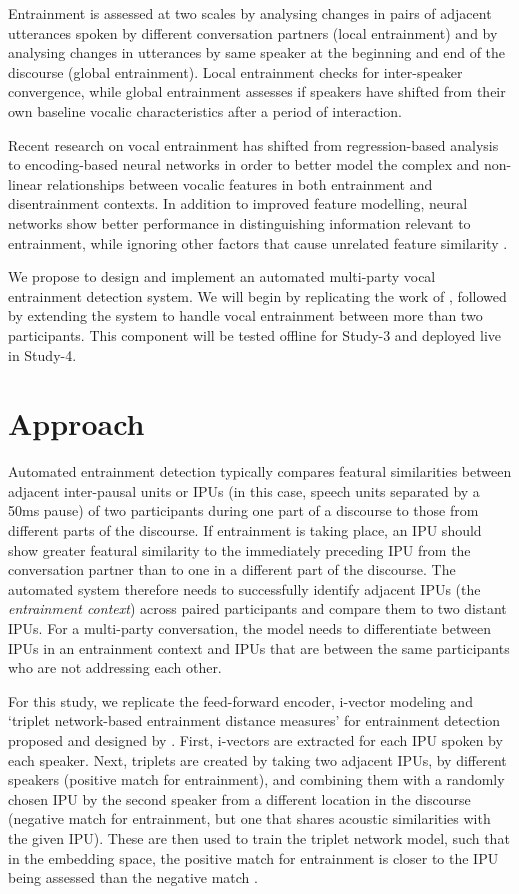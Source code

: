 Entrainment is assessed at two scales by analysing changes in pairs of adjacent
utterances spoken by different conversation partners (local entrainment) and by
analysing changes in utterances by same speaker at the beginning and end of the
discourse (global entrainment). Local entrainment checks for inter-speaker
convergence, while global entrainment assesses if speakers have shifted from
their own baseline vocalic characteristics after a period of interaction. 

Recent research on vocal entrainment has shifted from regression-based
analysis to encoding-based neural networks in order to better model the
complex and non-linear relationships between vocalic features in both
entrainment and disentrainment contexts. In addition to improved feature
modelling, neural networks show better performance in distinguishing
information relevant to entrainment, while ignoring other factors that
cause unrelated feature similarity \citep{nasir2020}.

We propose to design and implement an automated multi-party vocal entrainment
detection system. We will begin by replicating the work of \citet{nasir2020},
followed by extending the system to handle vocal entrainment between more than
two participants. This component will be tested offline for Study-3 and
deployed live in Study-4.

\section{Approach}

Automated entrainment detection typically compares featural similarities
between adjacent inter-pausal units or IPUs (in this case, speech units
separated by a 50ms pause) of two participants during one part of a discourse
to those from different parts of the discourse. If entrainment is taking place,
an IPU should show greater featural similarity to the immediately preceding IPU
from the conversation partner than to one in a different part of the discourse.
The automated system therefore needs to successfully identify adjacent IPUs
(the \emph{entrainment context}) across paired participants and compare them
to two distant IPUs. For a multi-party conversation, the model needs to
differentiate between IPUs in an entrainment context and IPUs that are
between the same participants who are not addressing each other.

For this study, we replicate the feed-forward encoder, i-vector modeling and
`triplet network-based entrainment distance measures' for entrainment detection
proposed and designed by \citet{nasir2020}. First, i-vectors are
extracted for each IPU spoken by each speaker. Next, triplets are created by
taking two adjacent IPUs, by different
speakers (positive match for entrainment), and combining them with a randomly
chosen IPU by the second speaker from a different location in the discourse
(negative match for entrainment, but one that shares acoustic similarities with
the given IPU). These are then used to train the triplet network
model, such that in the embedding space, the positive match for entrainment is
closer to the IPU being assessed than the negative match \cite{hoffer2015deep}.

